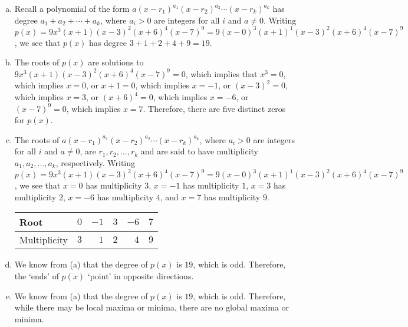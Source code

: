 \documentclass[12pt,letterpaper]{exam}
\begin{document}
\begin{questions}
\sol 
\begin{enumerate}[(a)]
\item Recall a polynomial of the form $a(x - r_1)^{a_1} (x - r_2)^{a_2} \cdots (x - r_k)^{a_k}$ has degree $a_1 + a_2 + \cdots + a_k$, where $a_i > 0$ are integers for all $i$ and $a \neq 0$. Writing $p(x)= 9x^3 (x + 1) (x - 3)^2 (x + 6)^4 (x - 7)^9= 9(x - 0)^3 (x + 1)^1 (x - 3)^2 (x + 6)^4 (x - 7)^9$, we see that $p(x)$ has degree $3 + 1 + 2 + 4 + 9= 19$. \pspace

\item The roots of $p(x)$ are solutions to $9x^3 (x + 1) (x - 3)^2 (x + 6)^4 (x - 7)^9= 0$, which implies that $x^3= 0$, which implies $x= 0$, or $x + 1= 0$, which implies $x= -1$, or $(x - 3)^2= 0$, which implies $x= 3$, or $(x + 6)^4= 0$, which implies $x= -6$, or $(x - 7)^9= 0$, which implies $x= 7$. Therefore, there are five distinct zeros for $p(x)$. \pspace

\item The roots of $a(x - r_1)^{a_1} (x - r_2)^{a_2} \cdots (x - r_k)^{a_k}$, where $a_i > 0$ are integers for all $i$ and $a \neq 0$, are $r_1, r_2, \ldots, r_k$ and are said to have multiplicity $a_1, a_2, \ldots, a_k$, respectively. Writing $p(x)= 9x^3 (x + 1) (x - 3)^2 (x + 6)^4 (x - 7)^9= 9(x - 0)^3 (x + 1)^1 (x - 3)^2 (x + 6)^4 (x - 7)^9$, we see that $x= 0$ has multiplicity $3$, $x= -1$ has multiplicity $1$, $x= 3$ has multiplicity $2$, $x= -6$ has multiplicity $4$, and $x= 7$ has multiplicity $9$. \par
	\begin{table}[ht]
	\centering
	\begin{tabular}{l||r|r|r|r|r}
	Root & $0$ & $-1$ & $3$ & $-6$ & $7$ \\ \hline
	Multiplicity & $3$ & $1$ & $2$ & $4$ & $9$
	\end{tabular}
	\end{table}

\item We know from (a) that the degree of $p(x)$ is $19$, which is odd. Therefore, the `ends' of $p(x)$ `point' in opposite directions. \pspace

\item We know from (a) that the degree of $p(x)$ is $19$, which is odd. Therefore, while there may be local maxima or minima, there are no global maxima or minima.  
\end{enumerate}




\end{questions}
\end{document}
